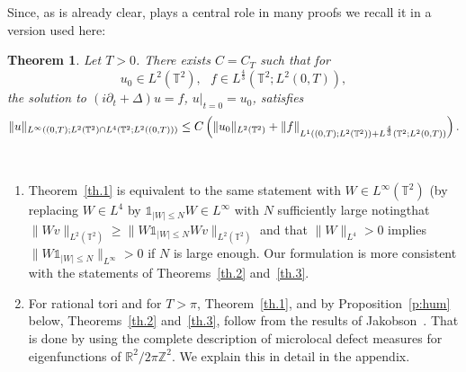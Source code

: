 \documentclass[10pt]{amsart}
\newtheorem{theo}{Theorem}[section]
\theoremstyle{definition}\newtheorem{defi}[theo]{Definition}\newtheorem{rema}[theo]{Remark}\newtheorem{exam}[theo]{Example}\newtheorem{exem}[theo]{Example}\newtheorem{nota}[theo]{Notation}
\newcommand*\bbbone{\mathds{1}}
\newcommand{\R}{{\mathbb R}}
\newcommand{\TT}{{\mathbb T}}
\newcommand{\ZZ}{{\mathbb Z}}
\newenvironment{remasc*}{\let\pointir\relax \begin{remas*}}{\end{remas*}}
\newtheorem*{remas*}{Remarks}
\begin{document}
Since, as is already clear, \cite[Proposition~2.2]{BBZ} plays a central role in many proofs we recall it in a version used here:

\begin{theo}\label{th.BBZ}
Let $ T > 0 $. There exists $ C = C_T $ such that for
\[
u_0\in L^2(\TT^2), \ \ \ f \in L^{\frac 4 3 } (\TT^2 ; L^2(0, T)),
\]
the solution to $ (i \partial_t + \Delta) u =f$, $ u|_{t=0} = u_0$, satisfies
\[
\| u\|_{L^\infty ((0, T) ; L^2 (\TT^2) \cap L^4(\TT^2; L^2((0,T)))}\\
\leq C \left(\|u_0\|_{L^2(\TT^2)} + \|f\|_{ L^1 ((0,T) ; L^2 (\TT^2)) + L^{\frac 4 3 } (\TT^2 ; L^2(0, T))}\right).
\]
\end{theo}

\begin{remasc*}\ 
\begin{enumerate}
\item \label{rem1} Theorem~\ref{th.1} is equivalent to the same statement with $ W \in L^\infty (\TT^2)$ (by replacing $ W \in L^4 $ by $ \bbbone_{ |W | \leq N } W \in L^\infty $ with $ N$ sufficiently large noting\linebreak that $ \| W v \|_{ L^2 (\TT^2) } \geq \| W \bbbone_{ |W | \leq N } W v \|_{ L^2 (\TT^2) } $ and that $ \|W \|_{L^4} > 0 $ implies \linebreak$\| W \bbbone_{ |W | \leq N } \|_{L^\infty}> 0 $ if $ N $ is large enough. Our formulation is more consistent with the statements of Theorems~\ref{th.2} and~\ref{th.3}.

\item \label{rem2} For rational tori and for $ T > \pi $, Theorem~\ref{th.1}, and by Proposition~\ref{p:hum} below, Theorems~\ref{th.2} and~\ref{th.3}, follow from the results of Jakobson~\cite{Jak}. That is done by using the complete description of microlocal defect measures for eigenfunctions of $
\mathcal \R^2 / 2 \pi \ZZ^2 $. We explain this in detail in the appendix.


\end{enumerate}
\end{remasc*}
\end{document}
